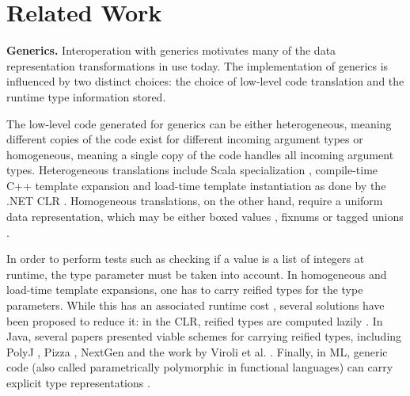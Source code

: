 \section{Related Work}
\label{ldl:sec:related}

\textbf{Generics.} Interoperation with generics motivates many of the data representation transformations in use today. The implementation of generics is influenced by two distinct choices: the choice of low-level code translation and the runtime type information stored.

The low-level code generated for generics can be either heterogeneous, meaning different copies of the code exist for different incoming argument types or homogeneous, meaning a single copy of the code handles all incoming argument types. Heterogeneous translations include Scala specialization \cite{iuli-thesis}, compile-time C++ template expansion \cite{cxx-stroustrup} and load-time template instantiation \cite{dot-net-generics} as done by the .NET CLR \cite{ecma-dotnet}. Homogeneous translations, on the other hand, require a uniform data representation, which may be either boxed values \cite{java-erasure, leroy-unboxed-objects}, fixnums \cite{fixnums-lisp} or tagged unions \cite{morrison-napier88}.

In order to perform tests such as checking if a value is a list of integers at runtime, the type parameter must be taken into account. In homogeneous and load-time template expansions, one has to carry reified types for the type parameters. While this has an associated runtime cost \cite{michel-thesis}, several solutions have been proposed to reduce it: in the CLR, reified types are computed lazily \cite{dot-net-generics}. In Java, several papers presented viable schemes for carrying reified types, including PolyJ \cite{myers-polyj}, Pizza \cite{pizza}, NextGen \cite{cartwright-nextgen} and the work by Viroli et al. \cite{viroli-reflective}. Finally, in ML, generic code (also called parametrically polymorphic in functional languages) can carry explicit type representations \cite{harper-intensional-type-analysis, tarditi-til}.

